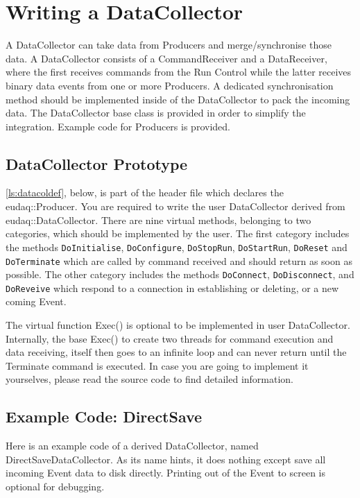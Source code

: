 \section{Writing a DataCollector}\label{sec:DataCollectorWriting}
A DataCollector can take data from Producers and merge/synchronise those data.
A DataCollector consists of a CommandReceiver and a DataReceiver, where the first receives commands from the Run Control while the latter receives binary data events from one or more Producers. A dedicated synchronisation method should be implemented inside of the DataCollector to pack the incoming data.
The DataCollector base class is provided in order to simplify the integration. Example code for Producers is provided.

\subsection{DataCollector Prototype}\label{sec:datacollector_hh}

\autoref{ls:datacoldef}, below, is part of the header file which declares the eudaq::Producer. You are required to write the user DataCollector derived from eudaq::DataCollector.
There are nine virtual methods, belonging to two categories, which should be implemented by the user. The first category includes the methods \lstinline[style=cpp]{DoInitialise},
\lstinline[style=cpp]{DoConfigure}, \lstinline[style=cpp]{DoStopRun}, \lstinline[style=cpp]{DoStartRun}, \lstinline[style=cpp]{DoReset} and \lstinline[style=cpp]{DoTerminate} which are called by command received and should return as soon as possible. The other category includes the methods \lstinline[style=cpp]{DoConnect}, \lstinline[style=cpp]{DoDisconnect}, and \lstinline[style=cpp]{DoReveive} which respond to a connection in establishing or deleting, or a new coming Event.



The virtual function Exec() is optional to be implemented in user DataCollector. Internally, the base Exec() to create two threads for command execution and data receiving,  itself then goes to an infinite loop and can never return until the Terminate command is executed. In case you are going to implement it yourselves, please read the source code to find detailed information.

\subsection{Example Code: DirectSave}\label{sec:directsavedatacollector_cc}
Here is an example code of a derived DataCollector, named DirectSaveDataCollector. As its name hints,  it does nothing except save all incoming Event data to disk directly. Printing out of the Event to screen is optional for debugging.


